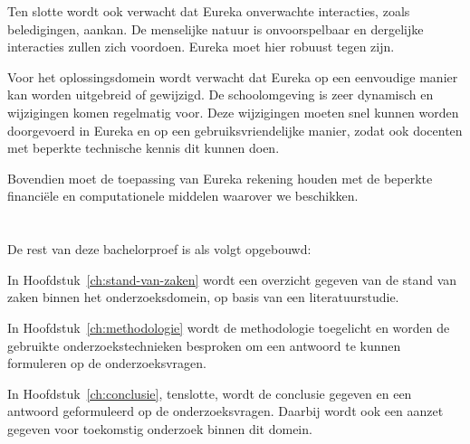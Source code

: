 Ten slotte wordt ook verwacht dat Eureka onverwachte interacties, zoals beledigingen, aankan. De menselijke natuur is onvoorspelbaar en dergelijke interacties zullen zich voordoen. Eureka moet hier robuust tegen zijn.

Voor het oplossingsdomein wordt verwacht dat Eureka op een eenvoudige manier kan worden uitgebreid of gewijzigd. De schoolomgeving is zeer dynamisch en wijzigingen komen regelmatig voor. Deze wijzigingen moeten snel kunnen worden doorgevoerd in Eureka en op een gebruiksvriendelijke manier, zodat ook docenten met beperkte technische kennis dit kunnen doen.

Bovendien moet de toepassing van Eureka rekening houden met de beperkte financiële en computationele middelen waarover we beschikken.

\section{}%
\label{sec:opzet-bachelorproef}


De rest van deze bachelorproef is als volgt opgebouwd:

In Hoofdstuk~\ref{ch:stand-van-zaken} wordt een overzicht gegeven van de stand van zaken binnen het onderzoeksdomein, op basis van een literatuurstudie.

In Hoofdstuk~\ref{ch:methodologie} wordt de methodologie toegelicht en worden de gebruikte onderzoekstechnieken besproken om een antwoord te kunnen formuleren op de onderzoeksvragen.


In Hoofdstuk~\ref{ch:conclusie}, tenslotte, wordt de conclusie gegeven en een antwoord geformuleerd op de onderzoeksvragen. Daarbij wordt ook een aanzet gegeven voor toekomstig onderzoek binnen dit domein.